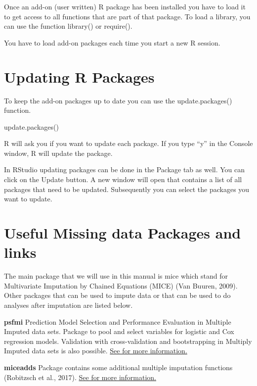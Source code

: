 \documentclass[
]{book}
\newenvironment{Shaded}{\begin{snugshade}}{\end{snugshade}}
\newcommand{\FunctionTok}[1]{\textcolor[rgb]{0.00,0.00,0.00}{#1}}
\newcommand{\NormalTok}[1]{#1}
\begin{document}
Once an add-on (user written) R package has been installed you have to load it to get access to all functions that are part of that package. To load a library, you can use the function library() or require().

You have to load add-on packages each time you start a new R session.

\hypertarget{updating-r-packages}{%
\section{Updating R Packages}\label{updating-r-packages}}

To keep the add-on packages up to date you can use the update.packages() function.

\begin{Shaded}
\begin{Highlighting}[]
\FunctionTok{update.packages}\NormalTok{()}
\end{Highlighting}
\end{Shaded}

R will ask you if you want to update each package. If you type ``y'' in the Console window, R will update the package.

In RStudio updating packages can be done in the Package tab as well. You can click on the Update button. A new window will open that contains a list of all packages that need to be updated. Subsequently you can select the packages you want to update.

\hypertarget{useful-missing-data-packages-and-links}{%
\section{Useful Missing data Packages and links}\label{useful-missing-data-packages-and-links}}

The main package that we will use in this manual is mice which stand for Multivariate Imputation by Chained Equations (MICE) (Van Buuren, 2009). Other packages that can be used to impute data or that can be used to do analyses after imputation are listed below.

\textbf{psfmi}
Prediction Model Selection and Performance Evaluation in Multiple Imputed data sets. Package to pool and select variables for logistic and Cox regression models. Validation with cross-validation and bootstrapping in Multiply Imputed data sets is also possible.
\href{https://mwheymans.github.io/psfmi/}{See for more information.}

\textbf{miceadds}
Package contains some additional multiple imputation functions (Robitzsch et al., 2017).
\href{https://cran.r-project.org/web/packages/miceadds/index.html}{See for more information.}
\end{document}
